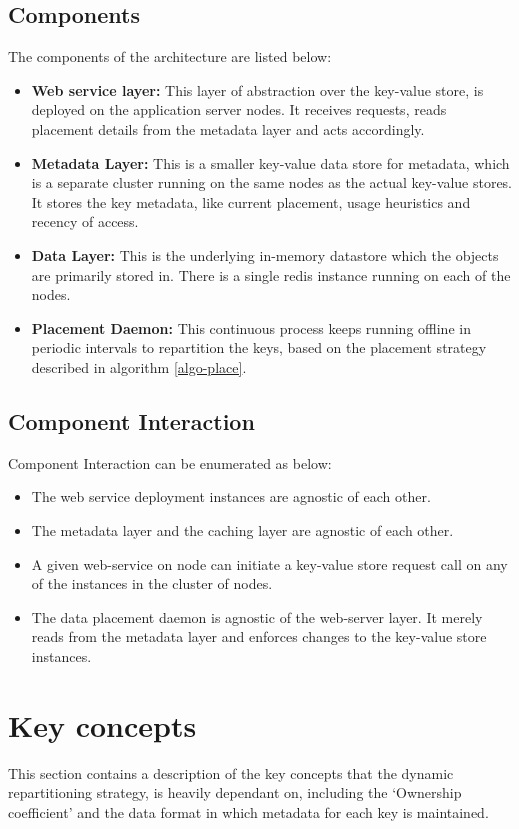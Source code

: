 \documentclass{sig-alternate}
\begin{document}
\subsection{Components}
The components of the architecture are listed below:
\begin{itemize}
	\item \textbf{Web service layer:} This layer of abstraction over the key-value store, is deployed on the application server nodes. It receives requests, reads placement details from the metadata layer and acts accordingly.
	\item \textbf{Metadata Layer:} This is a smaller key-value data store for metadata, which is a separate cluster running on the same nodes as the actual key-value stores. It stores the key metadata, like current placement, usage heuristics and recency of access.
	\item \textbf{Data Layer:} This is the underlying in-memory datastore which the objects are primarily stored in. There is a single redis instance running on each of the nodes.
	\item \textbf{Placement Daemon:} This continuous process keeps running offline in periodic intervals to repartition the keys, based on the placement strategy described in algorithm \ref{algo-place}.
\end{itemize}

\subsection{Component Interaction}
Component Interaction can be enumerated as below:
\begin{itemize}
	\item The web service deployment instances are agnostic of each other.
	\item The metadata layer and the caching layer are agnostic of each other.
	\item A given web-service on node can initiate a key-value store request call on any of the instances in the cluster of nodes.
	\item The data placement daemon is agnostic of the web-server layer. It merely reads from the metadata layer and enforces changes to the key-value store instances.
\end{itemize}


\section{Key concepts}
This section contains a description of the key concepts that the dynamic repartitioning strategy, is heavily dependant on, including the `Ownership coefficient' and the data format in which metadata for each key is maintained.\\
\end{document}

